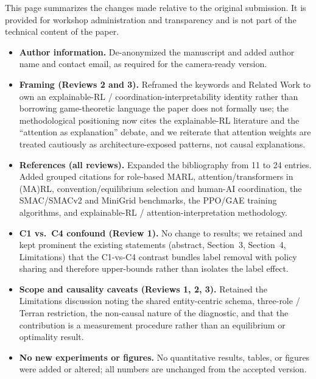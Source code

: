 \documentclass{nextgame2026}
\begin{document}
This page summarizes the changes made relative to the original submission. It is provided for workshop administration and transparency and is not part of the technical content of the paper.

\begin{itemize}
  \item \textbf{Author information.} De-anonymized the manuscript and added author name and contact email, as required for the camera-ready version.
  \item \textbf{Framing (Reviews 2 and 3).} Reframed the keywords and Related Work to own an explainable-RL / coordination-interpretability identity rather than borrowing game-theoretic language the paper does not formally use; the methodological positioning now cites the explainable-RL literature and the ``attention as explanation'' debate, and we reiterate that attention weights are treated cautiously as architecture-exposed patterns, not causal explanations.
  \item \textbf{References (all reviews).} Expanded the bibliography from 11 to 24 entries. Added grouped citations for role-based MARL, attention/transformers in (MA)RL, convention/equilibrium selection and human-AI coordination, the SMAC/SMACv2 and MiniGrid benchmarks, the PPO/GAE training algorithms, and explainable-RL / attention-interpretation methodology.
  \item \textbf{C1 vs.\ C4 confound (Review 1).} No change to results; we retained and kept prominent the existing statements (abstract, Section~3, Section~4, Limitations) that the C1-vs-C4 contrast bundles label removal with policy sharing and therefore upper-bounds rather than isolates the label effect.
  \item \textbf{Scope and causality caveats (Reviews 1, 2, 3).} Retained the Limitations discussion noting the shared entity-centric schema, three-role / Terran restriction, the non-causal nature of the diagnostic, and that the contribution is a measurement procedure rather than an equilibrium or optimality result.
  \item \textbf{No new experiments or figures.} No quantitative results, tables, or figures were added or altered; all numbers are unchanged from the accepted version.
\end{itemize}
\end{document}
